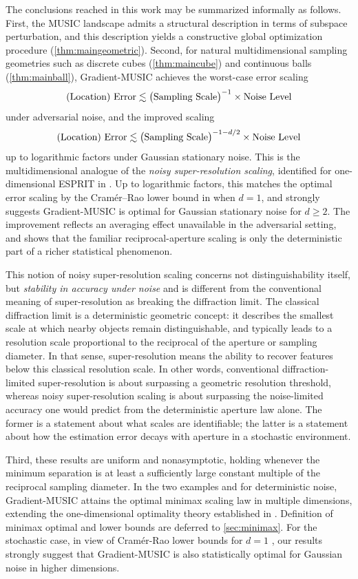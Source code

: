 \documentclass[11pt]{article}
\theoremstyle{definition}
\numberwithin{theorem}{section}
\numberwithin{lemma}{section}
\numberwithin{equation}{section}
\numberwithin{equation}{section}
\begin{document}
The conclusions reached in this work may be summarized informally as follows. First, the MUSIC landscape admits a structural description in terms of subspace perturbation, and this description yields a constructive global optimization procedure (\cref{thm:maingeometric}). Second, for natural multidimensional sampling geometries such as discrete cubes (\cref{thm:maincube}) and continuous balls (\cref{thm:mainball}), Gradient-MUSIC achieves the worst-case error scaling
\[
\hbox{(Location) Error}\lesssim
\big(\hbox{Sampling {Scale}}\big)^{-1}\times\hbox{Noise Level}
\]
under adversarial noise, and the improved scaling
\[
\hbox{(Location) Error}\lesssim
\big(\hbox{Sampling {Scale}}\big)^{-1-d/2}\times \hbox{Noise Level}
\]
up to logarithmic factors under Gaussian stationary noise.  
This is the multidimensional analogue of the {\em noisy super-resolution scaling}, identified for one-dimensional ESPRIT in \cite{ding2024esprit}. Up to logarithmic factors, this matches the optimal error scaling by the Cram\'er--Rao lower bound in \cite{stoica1989music} when $d=1$, and strongly suggests Gradient-MUSIC is optimal for Gaussian stationary noise for $d\geq 2$. The improvement reflects an averaging effect unavailable in the adversarial setting, and shows that the familiar reciprocal-aperture scaling is only the deterministic part of a richer statistical phenomenon. 

 This notion of noisy super-resolution scaling concerns not distinguishability itself, but \emph{stability in accuracy under noise} and is different from the conventional meaning of super-resolution as breaking the diffraction limit. 
The classical diffraction limit is a deterministic geometric concept: it describes the smallest scale at which nearby objects remain distinguishable, and typically leads to a resolution scale proportional to the reciprocal of the aperture or sampling diameter. In that sense, super-resolution means the ability to recover features below this classical resolution scale. In other words, conventional diffraction-limited super-resolution is about surpassing a geometric
resolution threshold, whereas noisy super-resolution scaling is about surpassing the noise-limited
accuracy one would predict from the deterministic aperture law alone. The former is a statement
about what scales are identifiable; the latter is a statement about how the estimation error decays
with aperture in a stochastic environment.

Third, these results are uniform and nonasymptotic, holding whenever the minimum separation is at least a sufficiently large constant multiple of the reciprocal sampling diameter. In the two examples and for deterministic noise, Gradient-MUSIC attains the optimal minimax scaling law in multiple dimensions, extending the one-dimensional optimality theory established in \cite{fannjiang2025optimality}. Definition of minimax optimal and lower bounds are deferred to \cref{sec:minimax}. For the stochastic case, in view of  Cram\'er-Rao lower bounds for $d=1$ \cite{stoica1989music}, our results strongly suggest that Gradient-MUSIC is also statistically optimal for Gaussian noise in higher dimensions. 
\end{document}
